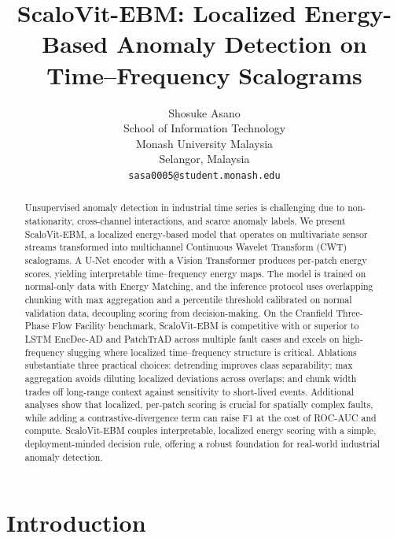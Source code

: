 \documentclass{article}
\title{ScaloVit-EBM: Localized Energy-Based Anomaly Detection on Time–Frequency Scalograms}
\author{%
  Shosuke Asano \\
  School of Information Technology\\
  Monash University Malaysia\\
  Selangor, Malaysia \\
  \texttt{sasa0005@student.monash.edu} \\
}
\begin{document}
\maketitle

\begin{abstract}
Unsupervised anomaly detection in industrial time series is challenging due to non-stationarity, cross-channel interactions, and scarce anomaly labels. We present ScaloVit-EBM, a localized energy-based model that operates on multivariate sensor streams transformed into multichannel Continuous Wavelet Transform (CWT) scalograms. A U-Net encoder with a Vision Transformer produces per-patch energy scores, yielding interpretable time–frequency energy maps. The model is trained on normal-only data with Energy Matching, and the inference protocol uses overlapping chunking with max aggregation and a percentile threshold calibrated on normal validation data, decoupling scoring from decision-making. On the Cranfield Three-Phase Flow Facility benchmark, ScaloVit-EBM is competitive with or superior to LSTM EncDec-AD and PatchTrAD across multiple fault cases and excels on high-frequency slugging where localized time–frequency structure is critical. Ablations substantiate three practical choices: detrending improves class separability; max aggregation avoids diluting localized deviations across overlaps; and chunk width trades off long-range context against sensitivity to short-lived events. Additional analyses show that localized, per-patch scoring is crucial for spatially complex faults, while adding a contrastive-divergence term can raise F1 at the cost of ROC-AUC and compute. ScaloVit-EBM couples interpretable, localized energy scoring with a simple, deployment-minded decision rule, offering a robust foundation for real-world industrial anomaly detection.
\end{abstract}


\section{Introduction}
\end{document}
